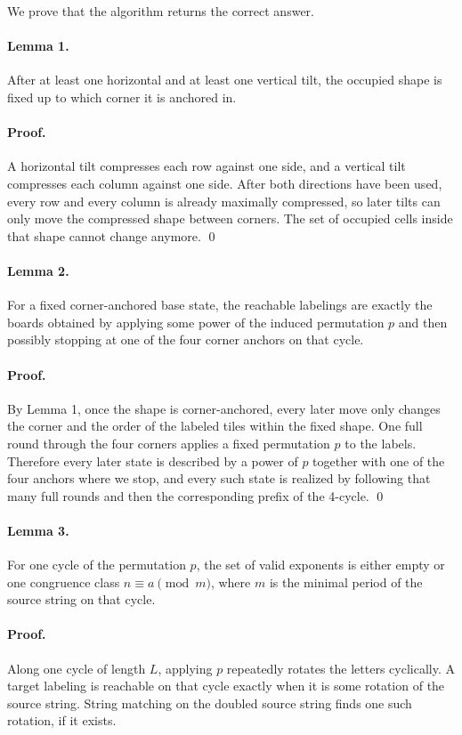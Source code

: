 \documentclass[11pt]{article}
\begin{document}
We prove that the algorithm returns the correct answer.

\paragraph{Lemma 1.}
After at least one horizontal and at least one vertical tilt, the occupied shape is fixed up to which corner
it is anchored in.

\paragraph{Proof.}
A horizontal tilt compresses each row against one side, and a vertical tilt compresses each column against
one side. After both directions have been used, every row and every column is already maximally
compressed, so later tilts can only move the compressed shape between corners. The set of occupied cells
inside that shape cannot change anymore. \qed

\paragraph{Lemma 2.}
For a fixed corner-anchored base state, the reachable labelings are exactly the boards obtained by
applying some power of the induced permutation $p$ and then possibly stopping at one of the four corner
anchors on that cycle.

\paragraph{Proof.}
By Lemma 1, once the shape is corner-anchored, every later move only changes the corner and the order
of the labeled tiles within the fixed shape. One full round through the four corners applies a fixed
permutation $p$ to the labels. Therefore every later state is described by a power of $p$ together with one
of the four anchors where we stop, and every such state is realized by following that many full rounds and
then the corresponding prefix of the 4-cycle. \qed

\paragraph{Lemma 3.}
For one cycle of the permutation $p$, the set of valid exponents is either empty or one congruence class
$n \equiv a \pmod m$, where $m$ is the minimal period of the source string on that cycle.

\paragraph{Proof.}
Along one cycle of length $L$, applying $p$ repeatedly rotates the letters cyclically. A target labeling is
reachable on that cycle exactly when it is some rotation of the source string. String matching on the
doubled source string finds one such rotation, if it exists.
\end{document}

